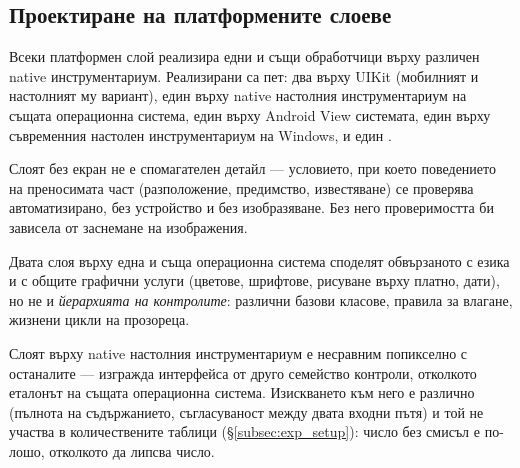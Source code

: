 \subsection{Проектиране на платформените слоеве}
\label{subsec:platform_design}

Всеки платформен слой реализира едни и същи обработчици върху различен native
инструментариум. Реализирани са пет: два върху UIKit (мобилният и настолният му вариант),
един върху native настолния инструментариум на същата операционна система, един върху
Android View системата, един върху съвременния настолен инструментариум на Windows, и
един .

Слоят без екран не е спомагателен детайл --- условието, при което поведението на
преносимата част (разположение, предимство, известяване) се проверява автоматизирано, без
устройство и без изобразяване. Без него проверимостта би зависела от заснемане на
изображения.

Двата слоя върху една и съща операционна система споделят обвързаното с езика и с общите
графични услуги (цветове, шрифтове, рисуване върху платно, дати), но не и
\emph{йерархията на контролите}: различни базови класове, правила за влагане, жизнени
цикли на прозореца.

Слоят върху native настолния инструментариум е несравним попикселно с останалите ---
изгражда интерфейса от друго семейство контроли, отколкото еталонът на същата операционна
система. Изискването към него е различно (пълнота на съдържанието, съгласуваност между
двата входни пътя) и той не участва в количествените таблици (§\ref{subsec:exp_setup}):
число без смисъл е по-лошо, отколкото да липсва число.
